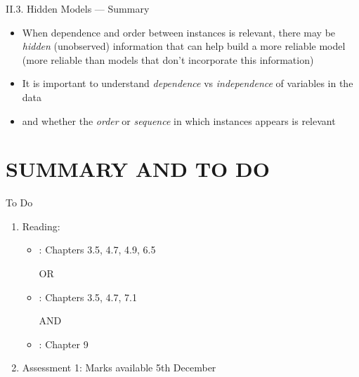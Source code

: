 \documentclass[handout]{beamer}
\begin{document}
\begin{frame}{II.3. Hidden Models --- Summary}
\begin{itemize}
\item When dependence and order between instances is relevant, there may be \emph{hidden} (unobserved) information that can help build a more reliable model (more reliable than models that don't incorporate this information)
\item It is important to understand \emph{dependence} vs \emph{independence} of variables in the data
\item and whether the \emph{order} or \emph{sequence} in which instances appears is relevant
\end{itemize}
\end{frame}


\section*{SUMMARY AND TO DO}
\begin{frame}{To Do}
\begin{enumerate}
\item Reading:
	\begin{itemize}
	\item \cite{WFH3:2011}: Chapters 3.5, 4.7, 4.9, 6.5
	\item[OR]
	\item \cite{WFH4:2016}: Chapters 3.5, 4.7, 7.1
	\item[AND]
	\item \cite{LB3:2011}: Chapter 9
	\end{itemize}
\item Assessment 1: Marks available 5th December
\end{enumerate}
\end{frame}
\end{document}

